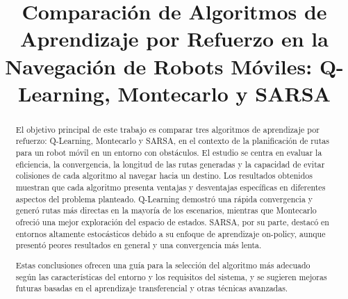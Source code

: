 \documentclass[conference,a4paper]{IEEEtran}
\begin{document}
\title{Comparación de Algoritmos de Aprendizaje por Refuerzo en la Navegación de Robots Móviles: Q-Learning, Montecarlo y SARSA}

\author{
  
  \and
  
}

\maketitle


\begin{abstract}
  El objetivo principal de este trabajo es comparar tres algoritmos de aprendizaje por refuerzo: Q-Learning, Montecarlo y SARSA, en el contexto de la planificación de rutas para un robot móvil en un entorno con obstáculos. El estudio se centra en evaluar la eficiencia, la convergencia, la longitud de las rutas generadas y la capacidad de evitar colisiones de cada algoritmo al navegar hacia un destino. Los resultados obtenidos muestran que cada algoritmo presenta ventajas y desventajas específicas en diferentes aspectos del problema planteado. Q-Learning demostró una rápida convergencia y generó rutas más directas en la mayoría de los escenarios, mientras que Montecarlo ofreció una mejor exploración del espacio de estados. SARSA, por su parte, destacó en entornos altamente estocásticos debido a su enfoque de aprendizaje on-policy, aunque presentó peores resultados en general y una convergencia más lenta.\newline
  
  Estas conclusiones ofrecen una guía para la selección del algoritmo más adecuado según las características del entorno y los requisitos del sistema, y se sugieren mejoras futuras basadas en el aprendizaje transferencial y otras técnicas avanzadas.\newline
\end{abstract}
\end{document}
